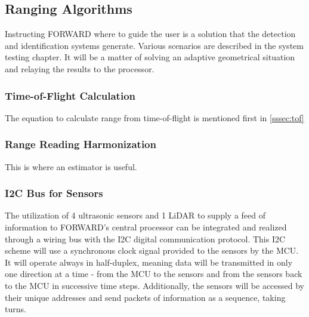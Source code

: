 \subsection{Ranging Algorithms}
\noindent Instructing FORWARD where to guide the user is a solution that the detection and identification systems generate. Various scenarios are described in the system testing chapter. It will be a matter of solving an adaptive geometrical situation and relaying the results to the processor.\\

\subsubsection{Time-of-Flight Calculation}
\noindent The equation to calculate range from time-of-flight is mentioned first in \ref{sssec:tof}\\

\subsubsection{Range Reading Harmonization}
\noindent This is where an estimator is useful.\\

\subsubsection{I2C Bus for Sensors}
\noindent The utilization of 4 ultrasonic sensors and 1 LiDAR to supply a feed of information to FORWARD's central processor can be integrated and realized through a wiring bus with the I2C digital communication protocol. This I2C scheme will use a synchronous clock signal provided to the sensors by the MCU. It will operate always in half-duplex, meaning data will be transmitted in only one direction at a time - from the MCU to the sensors and from the sensors back to the MCU in successive time steps. Additionally, the sensors will be accessed by their unique addresses and send packets of information as a sequence, taking turns.\\
